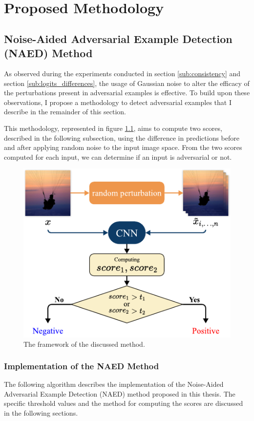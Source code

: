\chapter{Proposed Methodology}
\label{Methodology}
\overridetextsize

\section{Noise-Aided Adversarial Example Detection (NAED) Method}
As observed during the experiments conducted in section \ref{sub:consistency}
and section \ref{sub:logits_differences}, the usage of Gaussian noise to alter
the efficacy of the perturbations present in adversarial examples is effective.
To build upon these observations, I propose a methodology to detect adversarial
examples that I describe in the remainder of this section.

This methodology, represented in figure \ref{fig:framework}, aims to compute two
scores, described in the following subsection, using the difference in
predictions before and after applying random noise to the input image space.
From the two scores computed for each input, we can determine if an input is
adversarial or not.

\begin{figure}[htp]
    \centering
    \includegraphics[clip,width=0.9\columnwidth]{Figures/methodology/Framework.pdf}%

    \caption{The framework of the discussed method.}
    \label{fig:framework}
\end{figure}

\subsection{Implementation of the NAED Method}
\label{sub:implementation}
The following algorithm describes the implementation of the Noise-Aided
Adversarial Example Detection (NAED) method proposed in this thesis. The specific
threshold values and the method for computing the scores are discussed in the
following sections.

